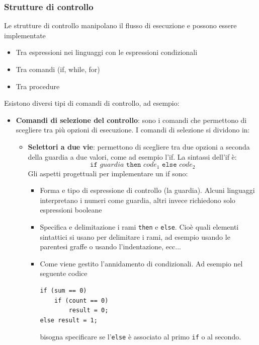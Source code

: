 \documentclass[a4paper]{article}
\begin{document}
\subsubsection{Strutture di controllo}
Le strutture di controllo manipolano il flusso di esecuzione e possono essere
implementate
\begin{itemize}
  \item Tra espressioni nei linguaggi con le espressioni condizionali
  \item Tra comandi (if, while, for)
  \item Tra procedure
\end{itemize}
Esistono diversi tipi di comandi di controllo, ad esempio:
\begin{itemize}
  \item \textbf{Comandi di selezione del controllo}: sono i comandi che permettono di
    scegliere tra più opzioni di esecuzione. I comandi di selezione si dividono
    in:
    \begin{itemize}
      \item \textbf{Selettori a due vie}: permettono di scegliere tra due opzioni
        a seconda della guardia a due valori, come ad esempio l'if. La sintassi
        dell'if è:
        \[
          \texttt{if } guardia \texttt{ then } code_1 \texttt{ else } code_2
        \] 
        Gli aspetti progettuali per implementare un if sono:
        \begin{itemize}
          \item Forma e tipo di espressione di controllo (la guardia). Alcuni linguaggi
            interpretano i numeri come guardia, altri invece richiedono solo espressioni
            booleane

          \item Specifica e delimitazione i rami \texttt{then} e \texttt{else}.
            Cioè quali elementi sintattici si usano per delimitare i rami, ad esempio
            usando le parentesi graffe o usando l'indentazione, ecc...

          \item Come viene gestito l'annidamento di condizionali. Ad esempio nel seguente
            codice
\begin{lstlisting}
if (sum == 0)
    if (count == 0)
        result = 0;
else result = 1;
\end{lstlisting}
            bisogna specificare se l'\texttt{else} è associato al primo \texttt{if} o
            al secondo.
        \end{itemize}


\end{itemize}
\end{itemize}
\end{document}

